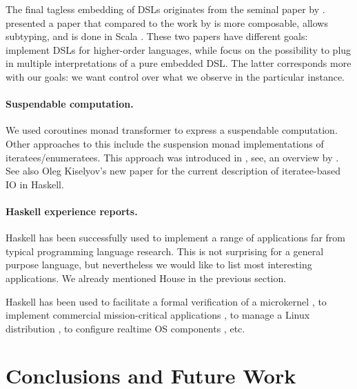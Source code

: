 The final tagless embedding of DSLs originates from the seminal paper by \citeauthor{final_tagless_embedding} \cite{final_tagless_embedding}.
\citeauthor{Hofer:2008:PED:1449913.1449935} \cite{Hofer:2008:PED:1449913.1449935} presented a paper that compared to the work by \citeauthor{final_tagless_embedding} \cite{final_tagless_embedding} is more composable, allows subtyping, and is done in Scala \cite{odersky2008programming}.
These two papers have different goals: \citeauthor{final_tagless_embedding} implement DSLs for higher-order languages, while \citeauthor{Hofer:2008:PED:1449913.1449935} focus on the possibility to plug in multiple interpretations of a pure embedded DSL.
The latter corresponds more with our goals: we want control over what we observe in the particular instance.

\paragraph{Suspendable computation.} We used coroutines monad transformer \cite{cmt} to express a suspendable computation.
Other approaches to this include the suspension monad implementations of iteratees/enumeratees. This approach was introduced in \cite{oleg-iteratee}, see, \eg an overview by \citeauthor{lato2010iteratee} \cite{lato2010iteratee}.
See also Oleg Kiselyov's new paper \cite{springerlink:10.1007/978-3-642-29822-6_15} for the current description of iteratee-based IO in Haskell.

\paragraph{Haskell experience reports.}
Haskell has been successfully used to implement a range of applications far from typical programming language research.
This is not surprising for a general purpose language, but nevertheless we would like to list most interesting applications.
We already mentioned House \cite{house} in the previous section.

Haskell has been used to facilitate a formal verification of a
microkernel \cite{Klein:2009:ERS:1631687.1596566}, to implement
commercial mission-critical applications
\cite{Sampson:2009:ERH:1631687.1596578}, to manage a Linux
distribution \cite{Beshers:2007:ERU:1291220.1291184}, to configure
realtime OS components \cite{Jones:2008:ERP:1411203.1411219}, etc.

\section{Conclusions and Future Work}
\label{sec:concl-future-work}

